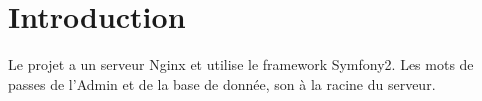 \chapter{Introduction}
Le projet a un serveur Nginx et utilise le framework Symfony2. Les mots de passes de l'Admin et de la base de donnée, son à la racine du serveur.